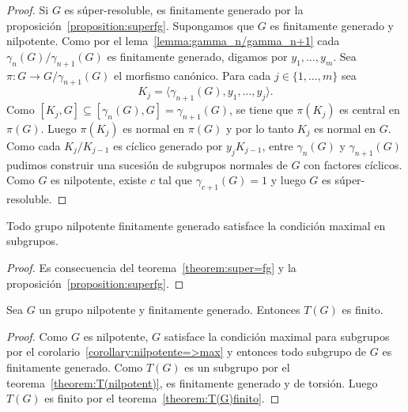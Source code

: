 \begin{proof}
	Si $G$ es súper-resoluble, es finitamente generado por la
	proposición~\ref{proposition:superfg}.  Supongamos que $G$ es finitamente
	generado y nilpotente. Como por el lema~\ref{lemma:gamma_n/gamma_n+1} cada
	$\gamma_{n}(G)/\gamma_{n+1}(G)$ es finitamente generado, digamos por
	$y_1,\dots,y_m$. Sea $\pi\colon G\to G/\gamma_{n+1}(G)$ el morfismo
	canónico.  Para cada $j\in\{1,\dots,m\}$ sea 
	\[
	K_j=\langle \gamma_{n+1}(G),y_1,\dots,y_j\rangle.
	\]
	Como
	$[K_j,G]\subseteq [\gamma_n(G),G]=\gamma_{n+1}(G)$, 
	se tiene que $\pi(K_j)$ es central en $\pi(G)$. Luego $\pi(K_j)$ es normal
	en $\pi(G)$ y por lo tanto $K_j$ es normal en $G$. Como cada $K_j/K_{j-1}$
	es cíclico generado por $y_jK_{j-1}$, entre $\gamma_n(G)$ y
	$\gamma_{n+1}(G)$ pudimos construir una sucesión de subgrupos normales de
	$G$ con factores cíclicos. Como $G$ es nilpotente, existe $c$ tal que
	$\gamma_{c+1}(G)=1$ y luego $G$ es súper-resoluble.
\end{proof}

\begin{corollary}
	\label{corollary:nilpotente=>max}
	Todo grupo nilpotente finitamente generado satisface la condición maximal
	en subgrupos.
\end{corollary}

\begin{proof}
	Es consecuencia del teorema~\ref{theorem:super=fg} y la
	proposición~\ref{proposition:superfg}.
\end{proof}

\begin{theorem}
	Sea $G$ un grupo nilpotente y finitamente generado. Entonces $T(G)$ es
	finito.
\end{theorem}

\begin{proof}
	Como $G$ es nilpotente, $G$ satisface la condición maximal para subgrupos
	por el corolario~\ref{corollary:nilpotente=>max} y entonces
	todo subgrupo de $G$ es finitamente generado. Como $T(G)$ es un subgrupo por el teorema~\ref{theorem:T(nilpotent)}, 
	es finitamente generado y de torsión. Luego $T(G)$ es finito por el
	teorema~\ref{theorem:T(G)finito}.
\end{proof}




